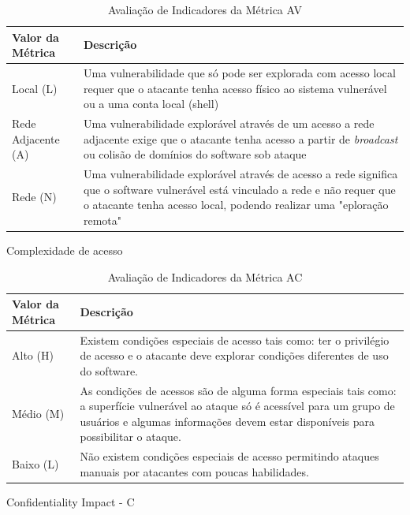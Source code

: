 \begin{itemize}
\begin{table}[H]
	\begin{center}
	    \begin{tabular}{ | l | p{10cm} |}
	    \hline
	    Valor da Métrica & Descrição \\ \hline
	    Local (L) & Uma vulnerabilidade que só pode ser explorada com acesso local requer que o atacante tenha acesso físico ao sistema vulnerável ou a uma conta local (shell) \\ \hline
	    Rede Adjacente (A) & Uma vulnerabilidade explorável através de um acesso a rede adjacente exige que o atacante tenha acesso a partir de \emph{broadcast} ou colisão de domínios do software sob ataque \\ \hline
	    Rede (N) & Uma vulnerabilidade explorável através de acesso a rede significa que o software vulnerável está vinculado a rede e não requer que o atacante tenha acesso local, podendo realizar uma "eploração remota" \\ \hline
	    \end{tabular}
	    \caption{Avaliação de Indicadores da Métrica AV}
	    \label{tab:av_scoring}
	\end{center}
	\end{table}

Complexidade de acesso
	\begin{table}[H]
	\begin{center}
	    \begin{tabular}{ | l | p{10cm} |}
	    \hline
	    Valor da Métrica & Descrição \\ \hline
	    Alto (H) & Existem condições especiais de acesso tais como: ter o privilégio de acesso e o atacante deve explorar condições diferentes de uso do software. \\ \hline
	    Médio (M) & As condições de acessos são de alguma forma especiais tais como: a superfície vulnerável ao ataque só é acessível para um grupo de usuários e algumas informações devem estar disponíveis para possibilitar o ataque. \\ \hline
	    Baixo (L) & Não existem condições especiais de acesso permitindo ataques manuais por atacantes com poucas habilidades.\\ \hline
	    \end{tabular}
	    \caption{Avaliação de Indicadores da Métrica AC}
	    \label{tab:ac_scoring}
	\end{center}
	\end{table}

	Confidentiality Impact - C


\end{itemize}
